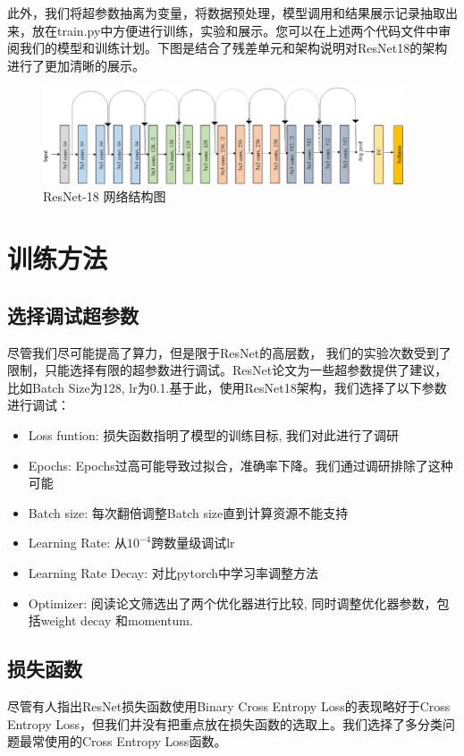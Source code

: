 \documentclass[hyperref, UTF8, 12pt]{article}
\theoremstyle{definition}
\begin{document}
\indent
此外，我们将超参数抽离为变量，将数据预处理，模型调用和结果展示记录抽取出来，放在train.py中方便进行训练，实验和展示。您可以在上述两个代码文件中审阅我们的模型和训练计划。下图是结合了残差单元和架构说明对ResNet18的架构进行了更加清晰的展示。
\begin{figure}[h] %
	\centering %
	\includegraphics[width=0.95\textwidth]{resnet18.png} %
	\caption{ResNet-18 网络结构图} %
	\label{Fig.resnet3} %
\end{figure}


\section{训练方法}
\subsection{选择调试超参数}
尽管我们尽可能提高了算力，但是限于ResNet的高层数， 我们的实验次数受到了限制，只能选择有限的超参数进行调试。ResNet论文\cite{he2015deep}为一些超参数提供了建议，比如Batch Size为128, lr为0.1.基于此，使用ResNet18架构，我们选择了以下参数进行调试：
\begin{itemize}
	\item Loss funtion: 损失函数指明了模型的训练目标, 我们对此进行了调研
	\item Epochs: Epochs过高可能导致过拟合，准确率下降。我们通过调研排除了这种可能
	\item Batch size: 每次翻倍调整Batch size直到计算资源不能支持
	\item Learning Rate: 从$10 ^ {-4}$跨数量级调试lr
	\item Learning Rate Decay: 对比pytorch中学习率调整方法
	\item Optimizer: 阅读论文筛选出了两个优化器进行比较, 同时调整优化器参数，包括weight decay 和momentum.
\end{itemize}

\subsection {损失函数}
尽管有人指出\cite{beyer2020imagenet}ResNet损失函数使用Binary Cross Entropy Loss的表现略好于Cross Entropy Loss，但我们并没有把重点放在损失函数的选取上。我们选择了多分类问题最常使用的Cross Entropy Loss函数。
\end{document}
